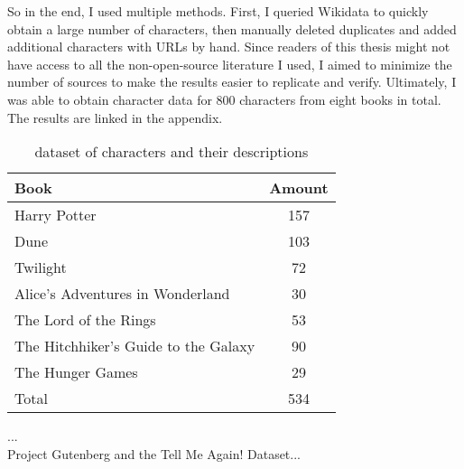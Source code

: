 So in the end, I used multiple methods. First, I queried Wikidata to quickly obtain a large number of characters, then manually deleted duplicates and added additional characters with URLs by hand. Since readers of this thesis might not have access to all the non-open-source literature I used, I aimed to minimize the number of sources to make the results easier to replicate and verify. Ultimately, I was able to obtain character data for 800 characters from eight books in total. The results are linked in the appendix.



\begin{table}[h!]
  \centering
  \begin{tabular}{|l|c|}
  \hline
  \textbf{Book} & \textbf{Amount} \\
  \hline
  Harry Potter & 157 \\
  \hline
  Dune & 103  \\
  \hline
  Twilight & 72  \\
  \hline
  Alice's Adventures in Wonderland & 30 \\
  \hline
  The Lord of the Rings & 53 \\
  \hline
  The Hitchhiker's Guide to the Galaxy & 90 \\
  \hline
  The Hunger Games & 29 \\
  \hline
  \hline
  Total & 534 \\
  \hline
  \end{tabular}
  \caption{dataset of characters and their descriptions}
  \label{tab:example_table}
  \end{table}
...\\


Project Gutenberg and the Tell Me Again! Dataset...






